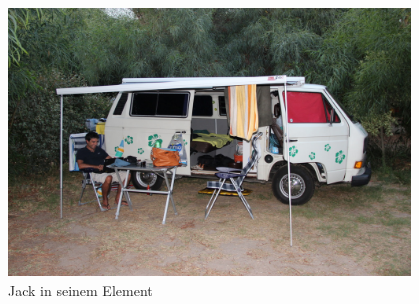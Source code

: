 \begin{figure}[hb]
    \centering
    \includegraphics[width=0.95\textwidth]{../Bilder/Sardinien/38.jpg}
    \caption{Jack in seinem Element}
    \label{img:Sardinien3}
\end{figure}

\newpage

